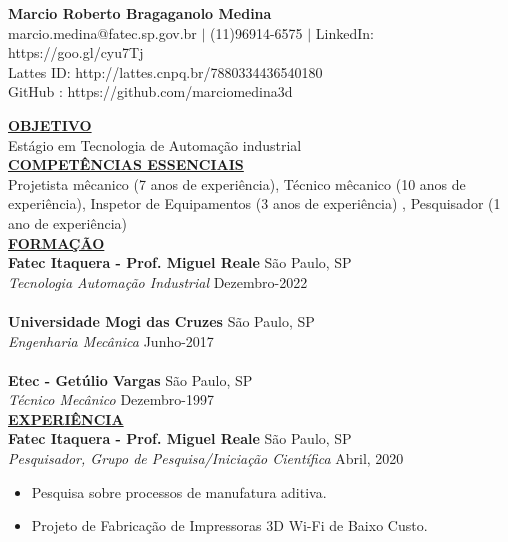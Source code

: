 \documentclass{article}
\begin{document}
\begin{center}
\thispagestyle{empty}
\large \textbf{Marcio Roberto Bragaganolo Medina \\}
\normalsize marcio.medina@fatec.sp.gov.br $\mid$ (11)96914-6575 $\mid$ LinkedIn: https://goo.gl/cyu7Tj \\
Lattes ID: http://lattes.cnpq.br/7880334436540180 \\
GitHub : https://github.com/marciomedina3d \\
\hrulefill
\end{center}


\noindent \textbf{\underline{OBJETIVO}}\\
\noindent Estágio em Tecnologia de Automação industrial\\

\noindent \textbf{\underline{COMPETÊNCIAS ESSENCIAIS}} \\
Projetista mêcanico (7 anos de experiência), Técnico mêcanico (10 anos de experiência), Inspetor de Equipamentos (3 anos de experiência) , Pesquisador (1 ano de experiência) \\

\noindent \textbf{\underline{FORMAÇÃO}} \\
\textbf{Fatec Itaquera - Prof. Miguel Reale} \hfill São Paulo, SP \\
\textit{Tecnologia Automação Industrial} \hfill Dezembro-2022 \\ \\
\textbf{Universidade Mogi das Cruzes} \hfill São Paulo, SP \\
\textit{Engenharia Mecânica} \hfill Junho-2017\\ \\
\textbf{Etec - Getúlio Vargas} \hfill São Paulo, SP \\
\textit{Técnico Mecânico} \hfill Dezembro-1997 \\

\noindent \textbf{\underline{EXPERIÊNCIA}} \\
\noindent \textbf{Fatec Itaquera - Prof. Miguel Reale} \hfill São Paulo, SP \\
\textit{Pesquisador, Grupo de Pesquisa/Iniciação Científica} \hfill Abril, 2020 
\begin{itemize}[noitemsep,nolistsep,leftmargin=*]
\item {Pesquisa sobre processos de manufatura aditiva.}
\item {Projeto de Fabricação de Impressoras 3D Wi-Fi de Baixo Custo.} \\
\end{itemize}
\end{document}
